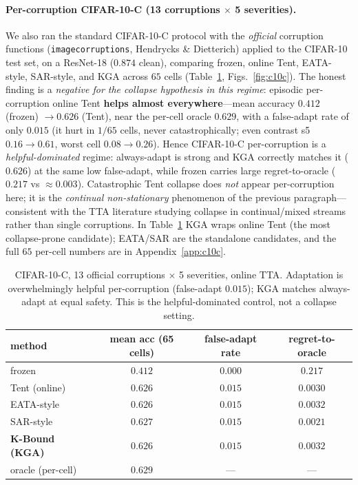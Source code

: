 \documentclass[conference]{IEEEtran}
\theoremstyle{plain}
\theoremstyle{definition}
\begin{document}
\paragraph{Per-corruption CIFAR-10-C (13 corruptions $\times$ 5 severities).} We also ran
the standard CIFAR-10-C protocol with the \emph{official} corruption functions
(\texttt{imagecorruptions}, Hendrycks \& Dietterich) applied to the CIFAR-10 test set, on a
ResNet-18 ($0.874$ clean), comparing frozen, online Tent, EATA-style, SAR-style, and
\textsc{KGA} across $65$ cells (Table~\ref{tab:c10c}, Figs.~\ref{fig:c10c}). The honest
finding is a \emph{negative for the collapse hypothesis in this regime}: episodic
per-corruption online Tent \textbf{helps almost everywhere}---mean accuracy $0.412$
(frozen) $\to 0.626$ (Tent), near the per-cell oracle $0.629$, with a false-adapt rate of
only $0.015$ (it hurt in $1/65$ cells, never catastrophically; even contrast s5
$0.16\!\to\!0.61$, worst cell $0.08\!\to\!0.26$). Hence CIFAR-10-C per-corruption is a
\emph{helpful-dominated} regime: always-adapt is strong and \textsc{KGA} correctly matches
it ($0.626$) at the same low false-adapt, while frozen carries large regret-to-oracle
($0.217$ vs $\approx0.003$). Catastrophic Tent collapse does \emph{not} appear
per-corruption here; it is the \emph{continual non-stationary} phenomenon of the previous
paragraph---consistent with the TTA literature studying collapse in continual/mixed
streams rather than single corruptions. In Table~\ref{tab:c10c} \textsc{KGA} wraps online
Tent (the most collapse-prone candidate); EATA/SAR are the standalone candidates, and the
full $65$ per-cell numbers are in Appendix~\ref{app:c10c}.

\begin{table}[t]\centering\small
\begin{tabular}{lccc}
\toprule
method & mean acc (65 cells) & false-adapt rate & regret-to-oracle \\
\midrule
frozen & $0.412$ & $0.000$ & $0.217$ \\
Tent (online) & $0.626$ & $0.015$ & $0.0030$ \\
EATA-style & $0.626$ & $0.015$ & $0.0032$ \\
SAR-style & $0.627$ & $0.015$ & $0.0021$ \\
\textbf{K-Bound (KGA)} & $0.626$ & $0.015$ & $0.0032$ \\
oracle (per-cell) & $0.629$ & --- & --- \\
\bottomrule
\end{tabular}
\caption{CIFAR-10-C, 13 official corruptions $\times$ 5 severities, online TTA. Adaptation
is overwhelmingly helpful per-corruption (false-adapt $0.015$); \textsc{KGA} matches
always-adapt at equal safety. This is the helpful-dominated control, not a collapse setting.}
\label{tab:c10c}
\end{table}
\end{document}
